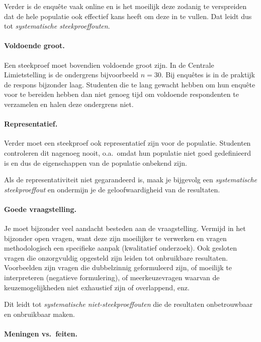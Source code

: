 Verder is de enquête vaak online en is het moeilijk deze zodanig te verspreiden dat de hele populatie ook effectief kans heeft om deze in te vullen. Dat leidt dus tot \emph{systematische steekproeffouten}.

\paragraph{Voldoende groot.}

Een steekproef moet bovendien voldoende groot zijn. In de Centrale Limietstelling is de ondergrens bijvoorbeeld $n = 30$. Bij enquêtes is in de praktijk de respons bijzonder laag. Studenten die te lang gewacht hebben om hun enquête voor te bereiden hebben dan niet genoeg tijd om voldoende respondenten te verzamelen en halen deze ondergrens niet.

\paragraph{Representatief.}

Verder moet een steekproef ook representatief zijn voor de populatie. Studenten controleren dit nagenoeg nooit, o.a.\ omdat hun populatie niet goed gedefinieerd is en dus de eigenschappen van de populatie onbekend zijn.

Als de representativiteit niet gegarandeerd is, maak je bijgevolg een \emph{systematische steekproeffout} en ondermijn je de geloofwaardigheid van de resultaten.

\paragraph{Goede vraagstelling.}

Je moet bijzonder veel aandacht besteden aan de vraagstelling. Vermijd in het bijzonder open vragen, want deze zijn moeilijker te verwerken en vragen methodologisch een specifieke aanpak (kwalitatief onderzoek). Ook gesloten vragen die onzorgvuldig opgesteld zijn leiden tot onbruikbare resultaten. Voorbeelden zijn vragen die dubbelzinnig geformuleerd zijn, of moeilijk te interpreteren (negatieve formulering), of meerkeuzevragen waarvan de keuzemogelijkheden niet exhaustief zijn of overlappend, enz.

Dit leidt tot \emph{systematische niet-steekproeffouten} die de resultaten onbetrouwbaar en onbruikbaar maken.

\paragraph{Meningen vs.\ feiten.}

